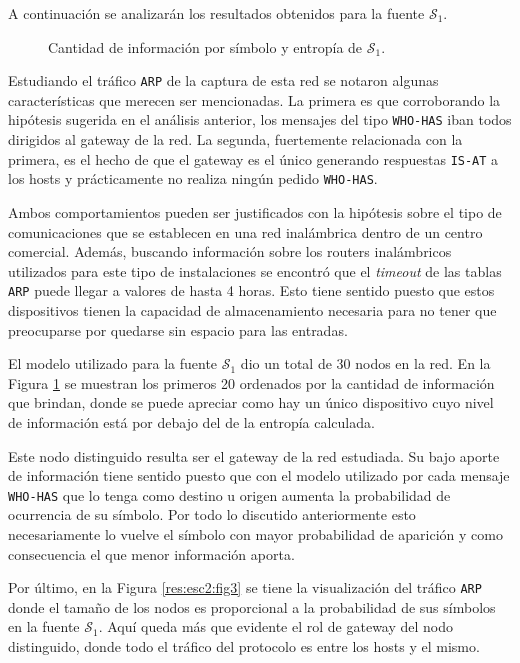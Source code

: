 A continuación se analizarán los resultados obtenidos para la fuente
$\mathcal{S}_1$.

\begin{figure}[h]
	\caption{Cantidad de información por símbolo y entropía de $\mathcal{S}_1$.}
    \label{res:esc2:fig2}
\end{figure}

Estudiando el tráfico \texttt{ARP} de la captura de esta red se notaron algunas
características que merecen ser mencionadas. La primera es que corroborando la
hipótesis sugerida en el análisis anterior, los mensajes del tipo
\texttt{WHO-HAS} iban todos dirigidos al gateway de la red. La segunda,
fuertemente relacionada con la primera, es el hecho de que el gateway es el
único generando respuestas \texttt{IS-AT} a los hosts y prácticamente no realiza
ningún pedido \texttt{WHO-HAS}.

Ambos comportamientos pueden ser justificados con la hipótesis sobre el tipo de
comunicaciones que se establecen en una red inalámbrica dentro de un centro
comercial. Además, buscando información sobre los routers inalámbricos
utilizados para este tipo de instalaciones se encontró que el \emph{timeout} de
las tablas \texttt{ARP} puede llegar a valores de hasta 4 horas. Esto tiene
sentido puesto que estos dispositivos tienen la capacidad de almacenamiento
necesaria para no tener que preocuparse por quedarse sin espacio para las
entradas.

El modelo utilizado para la fuente $\mathcal{S}_1$ dio un total de 30 nodos en la
red. En la Figura \ref{res:esc2:fig2} se muestran los primeros 20 ordenados por
la cantidad de información que brindan, donde se puede apreciar como hay un
único dispositivo cuyo nivel de información está por debajo del de la entropía
calculada.

Este nodo distinguido resulta ser el gateway de la red estudiada. Su bajo aporte
de información tiene sentido puesto que con el modelo utilizado por cada mensaje
\texttt{WHO-HAS} que lo tenga como destino u origen aumenta la probabilidad de
ocurrencia de su símbolo. Por todo lo discutido anteriormente esto
necesariamente lo vuelve el símbolo con mayor probabilidad de aparición y como
consecuencia el que menor información aporta.

Por último, en la Figura \ref{res:esc2:fig3} se tiene la visualización del
tráfico \texttt{ARP} donde el tamaño de los nodos es proporcional a la
probabilidad de sus símbolos en la fuente $\mathcal{S}_1$. Aquí queda más que
evidente el rol de gateway del nodo distinguido, donde todo el tráfico del
protocolo es entre los hosts y el mismo.


